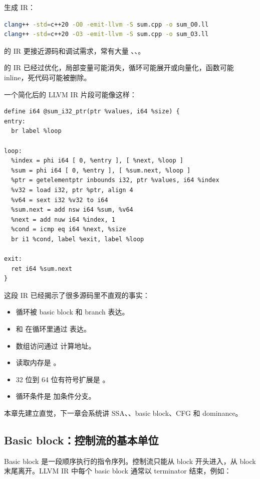 生成 IR：

\begin{lstlisting}[language=bash]
clang++ -std=c++20 -O0 -emit-llvm -S sum.cpp -o sum_O0.ll
clang++ -std=c++20 -O3 -emit-llvm -S sum.cpp -o sum_O3.ll
\end{lstlisting}

 的 IR 更接近源码和调试需求，常有大量 、、。

 的 IR 已经过优化，局部变量可能消失，循环可能展开或向量化，函数可能 inline，死代码可能被删除。

一个简化后的 LLVM IR 片段可能像这样：

\begin{lstlisting}
define i64 @sum_i32_ptr(ptr %values, i64 %size) {
entry:
  br label %loop

loop:
  %index = phi i64 [ 0, %entry ], [ %next, %loop ]
  %sum = phi i64 [ 0, %entry ], [ %sum.next, %loop ]
  %ptr = getelementptr inbounds i32, ptr %values, i64 %index
  %v32 = load i32, ptr %ptr, align 4
  %v64 = sext i32 %v32 to i64
  %sum.next = add nsw i64 %sum, %v64
  %next = add nuw i64 %index, 1
  %cond = icmp eq i64 %next, %size
  br i1 %cond, label %exit, label %loop

exit:
  ret i64 %sum.next
}
\end{lstlisting}

这段 IR 已经揭示了很多源码里不直观的事实：

\begin{itemize}
  \item 循环被 basic block 和 branch 表达。
  \item {} 和  在循环里通过  表达。
  \item 数组访问通过  计算地址。
  \item 读取内存是 。
  \item 32 位到 64 位有符号扩展是 。
  \item 循环条件是  加条件分支。
\end{itemize}

本章先建立直觉，下一章会系统讲 SSA、、basic block、CFG 和 dominance。

\subsection{Basic block：控制流的基本单位}

Basic block 是一段顺序执行的指令序列。控制流只能从 block 开头进入，从 block 末尾离开。LLVM IR 中每个 basic block 通常以 terminator 结束，例如：


